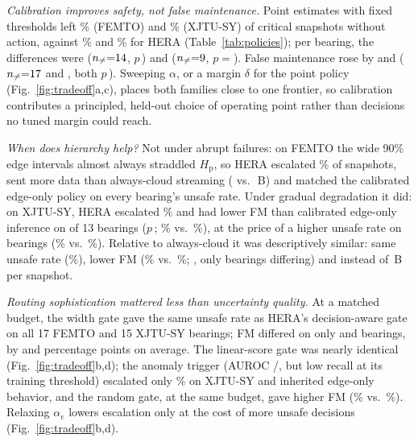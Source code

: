 \documentclass[conference]{IEEEtran}
\newcommand{\Hp}{H_{\mathrm{p}}}
\begin{document}
\textit{Calibration improves safety, not false maintenance.} Point estimates with fixed thresholds left \feUnsafePoint\% (FEMTO) and \xjUnsafePoint\% (XJTU-SY) of critical snapshots without action, against \feUnsafeHera\% and \xjUnsafeHera\% for HERA (Table~\ref{tab:policies}); per bearing, the differences were \feCiUnsafePt{} ($n_{\neq}{=}14$, $p$\,\fePHeraPoint) and \xjCiUnsafePt{} ($n_{\neq}{=}9$, $p{=}$\xjPHeraPoint). False maintenance rose by \feCiFmPt{} and \xjCiFmPt{} ($n_{\neq}{=}17$ and \xjNzFmHeraPoint, both $p$\,\fePFmHeraPoint). Sweeping $\alpha$, or a margin $\delta$ for the point policy (Fig.~\ref{fig:tradeoff}a,c), places both families close to one frontier, so calibration contributes a principled, held-out choice of operating point rather than decisions no tuned margin could reach.

\textit{When does hierarchy help?} Not under abrupt failures: on FEMTO the wide 90\% edge intervals almost always straddled $\Hp$, so HERA escalated \feEscHera\% of snapshots, sent more data than always-cloud streaming (\feBytesHera{} vs.\ \feBytesCloud\,B) and matched the calibrated edge-only policy on every bearing's unsafe rate. Under gradual degradation it did: on XJTU-SY, HERA escalated \xjEscHera\% and had lower FM than calibrated edge-only inference on \xjNzFmHeraEdge{} of 13 bearings ($p$\,\xjPFmHeraEdge; \xjFmHera\% vs.\ \xjFmEdge\%), at the price of a higher unsafe rate on \xjNzHeraEdge{} bearings (\xjUnsafeHera\% vs.\ \xjUnsafeEdge\%). Relative to always-cloud it was descriptively similar: same unsafe rate (\xjUnsafeHera\%), lower FM (\xjFmHera\% vs.\ \xjFmCloud\%; \xjCiFmCl, only \xjNzFmHeraCloud{} bearings differing) and \xjBytesHera{} instead of \xjBytesCloud\,B per snapshot.

\textit{Routing sophistication mattered less than uncertainty quality.} At a matched budget, the width gate gave the same unsafe rate as HERA's decision-aware gate on all 17 FEMTO and 15 XJTU-SY bearings; FM differed on only \feRobNzFmWidth{} and \xjRobNzFmWidth{} bearings, by \feRobFmWidthDiff{} and \xjRobFmWidthDiff{} percentage points on average. The linear-score gate was nearly identical (Fig.~\ref{fig:tradeoff}b,d); the anomaly trigger (AUROC \feDetAnomAuroc/\xjDetAnomAuroc, but low recall at its training threshold) escalated only \xjEscHeraFixed\% on XJTU-SY and inherited edge-only behavior, and the random gate, at the same budget, gave higher FM (\xjFmRandom\% vs.\ \xjFmHera\%). Relaxing $\alpha_e$ lowers escalation only at the cost of more unsafe decisions (Fig.~\ref{fig:tradeoff}b,d).
\end{document}
